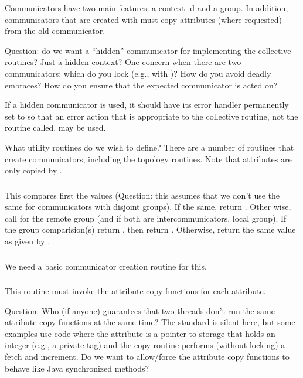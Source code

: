 \documentclass{article}
\begin{document}
Communicators have two main features: a context id and a group.  In
addition, communicators that are created with  must
copy attributes (where requested) from the old communicator.

Question: do we want a ``hidden'' communicator for implementing the
collective routines?  Just a hidden context?  One concern when there
are two communicators: which do you lock (e.g., with
)?  How do you avoid deadly embraces?  How do
you 
ensure that the expected communicator is acted on?

If a hidden communicator is used, it should have its error handler permanently
set to  so that an error action that is appropriate to
the collective routine, not the routine called, may be used.

What utility routines do we wish to define?  There are a number of
routines that create communicators, including the topology routines.
Note that attributes are only copied by .

\subsubsection{}
This compares first the  values (Question: this assumes that
we don't use the same  for communicators with disjoint
groups).  If the same, return .  Other wise, call
 for the remote group (and if both are
intercommunicators, local group).  If the group comparision(s) return
, then return .  Otherwise, return
the same value as given by .

\subsubsection{}
We need a basic communicator creation routine for this.

\subsubsection{}
This routine must invoke the attribute copy functions for each attribute.

Question: Who (if anyone) guarantees that two threads don't run the same
attribute copy functions at the same time?  The standard is silent here, but
some examples use code where the attribute is a pointer to storage that holds
an integer (e.g., a private tag) and the copy routine performs (without
locking) a fetch and increment.  Do we want to allow/force the attribute copy
functions to behave like Java synchronized methods?
\end{document}
